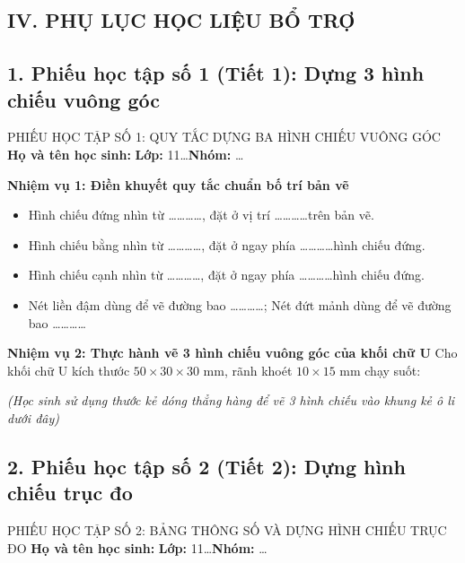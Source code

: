 \documentclass[12pt, a4paper]{article}
\begin{document}
\begin{itemize}[leftmargin=1.2cm]
\section*{IV. PHỤ LỤC HỌC LIỆU BỔ TRỢ}

\subsection*{1. Phiếu học tập số 1 (Tiết 1): Dựng 3 hình chiếu vuông góc}

\begin{pedabox}{PHIẾU HỌC TẬP SỐ 1: QUY TẮC DỰNG BA HÌNH CHIẾU VUÔNG GÓC}
    \textbf{Họ và tên học sinh:} \dotfill \textbf{Lớp:} 11\dots \textbf{Nhóm:} \dots
    
    \textbf{Nhiệm vụ 1: Điền khuyết quy tắc chuẩn bố trí bản vẽ}
    \begin{itemize}[leftmargin=0.6cm]
        \item Hình chiếu đứng nhìn từ \dots\dots\dots\dots, đặt ở vị trí \dots\dots\dots\dots trên bản vẽ.
        \item Hình chiếu bằng nhìn từ \dots\dots\dots\dots, đặt ở ngay phía \dots\dots\dots\dots hình chiếu đứng.
        \item Hình chiếu cạnh nhìn từ \dots\dots\dots\dots, đặt ở ngay phía \dots\dots\dots\dots hình chiếu đứng.
        \item Nét liền đậm dùng để vẽ đường bao \dots\dots\dots\dots; Nét đứt mảnh dùng để vẽ đường bao \dots\dots\dots\dots
    \end{itemize}

    \textbf{Nhiệm vụ 2: Thực hành vẽ 3 hình chiếu vuông góc của khối chữ U}
    Cho khối chữ U kích thước $50 \times 30 \times 30\text{ mm}$, rãnh khoét $10 \times 15\text{ mm}$ chạy suốt:
    \begin{center}
    \textit{(Học sinh sử dụng thước kẻ dóng thẳng hàng để vẽ 3 hình chiếu vào khung kẻ ô li dưới đây)}
    \end{center}
    \vspace{4cm}
\end{pedabox}

\subsection*{2. Phiếu học tập số 2 (Tiết 2): Dựng hình chiếu trục đo}

\begin{pedabox}{PHIẾU HỌC TẬP SỐ 2: BẢNG THÔNG SỐ VÀ DỰNG HÌNH CHIẾU TRỤC ĐO}
    \textbf{Họ và tên học sinh:} \dotfill \textbf{Lớp:} 11\dots \textbf{Nhóm:} \dots


\end{pedabox}
\end{itemize}
\end{document}
